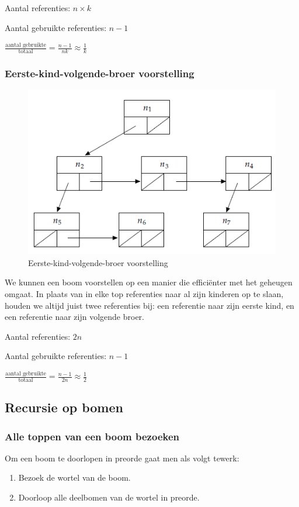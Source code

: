 \documentclass[a4paper,12pt]{article}
\begin{document}
Aantal referenties: $n \times k$

Aantal gebruikte referenties: $n-1$

$\frac{\text{aantal gebruikte}}{\text{totaal}}
=\frac{n-1}{nk} 
\approx \frac{1}{k}$

\subsubsection{Eerste-kind-volgende-broer voorstelling}
\begin{figure}[H]
	\centering
	\includegraphics[width=.5\linewidth]{img/Eerste-kind-volgende-broer}
  	\caption{Eerste-kind-volgende-broer voorstelling}
  	\label{fig:Eerste-kind-volgende-broer}
\end{figure}

We kunnen een boom voorstellen op een manier die efficiënter met het geheugen omgaat.
In plaats van in elke top referenties naar al zijn kinderen op te slaan, houden we altijd juist twee referenties bij: een referentie naar zijn eerste kind, en een referentie naar zijn volgende broer.

Aantal referenties: $2n$

Aantal gebruikte referenties: $n-1$

$\frac{\text{aantal gebruikte}}{\text{totaal}}
=\frac{n-1}{2n} 
\approx \frac{1}{2}$

\subsection{Recursie op bomen}
\subsubsection{Alle toppen van een boom bezoeken}
Om een boom te doorlopen in preorde gaat men als volgt tewerk:
\begin{enumerate}
\item Bezoek de wortel van de boom.
\item Doorloop alle deelbomen van de wortel in preorde.
\end{enumerate}
\end{document}
